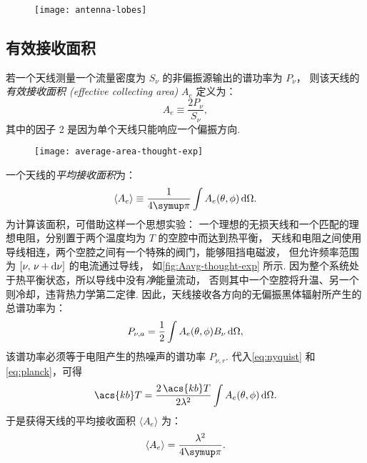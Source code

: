 \begin{figure}[htp]
  \centering
  \texttt{[image: antenna-lobes]}
  \label{fig:lobes}
\end{figure}

\subsection{有效接收面积}

若一个天线测量一个流量密度为 $S_{\nu}$ 的非偏振源输出的谱功率为 $P_{\nu}$，
则该天线的\emph{有效接收面积 (effective collecting area)} $A_e$ 定义为：
\begin{equation}
  \label{eq:area-eff}
  A_e \equiv \frac{2 P_{\nu}}{S_{\nu}} ,
\end{equation}
其中的因子 2 是因为单个天线只能响应一个偏振方向.

\begin{figure}[htp]
  \centering
  \texttt{[image: average-area-thought-exp]}
  \label{fig:Aavg-thought-exp}
\end{figure}

一个天线的\emph{平均接收面积}为：
\begin{equation}
  \label{eq:area-avg1}
  \langle A_e \rangle
    \equiv \frac{1}{4\Cpi} \int A_e(\theta,\phi) \,\D{\Omega} .
\end{equation}
为计算该面积，可借助这样一个思想实验：
一个理想的无损天线和一个匹配的理想电阻，分别置于两个温度均为 $T$ 的空腔中而达到热平衡，
天线和电阻之间使用导线相连，两个空腔之间有一个特殊的阀门，能够阻挡电磁波，
但允许频率范围为 $[\nu, \,\nu+\mathrm{d}\nu]$ 的电流通过导线，
如\autoref{fig:Aavg-thought-exp} 所示.
因为整个系统处于热平衡状态，所以导线中没有\emph{净}能量流动，
否则其中一个空腔将升温、另一个则冷却，违背热力学第二定律.
因此，天线接收各方向的无偏振黑体辐射所产生的总谱功率为：
\begin{equation}
  P_{\nu,a} = \frac{1}{2} \int A_e(\theta,\phi) B_{\nu} \,\mathrm{d}\Omega ,
\end{equation}
该谱功率必须等于电阻产生的热噪声的谱功率 $P_{\nu,r}$.
代入\autoref{eq:nyquist} 和\autoref{eq:planck}，可得
\begin{equation}
  \acs{kb}T = \frac{2\,\acs{kb}T}{2\lambda^2}
    \int A_e(\theta,\phi) \,\D{\Omega} .
\end{equation}
于是获得天线的平均接收面积 $\langle A_e \rangle$ 为：
\begin{equation}
  \label{eq:area-avg}
  \langle A_e \rangle = \frac{\lambda^2}{4\Cpi}.
\end{equation}

